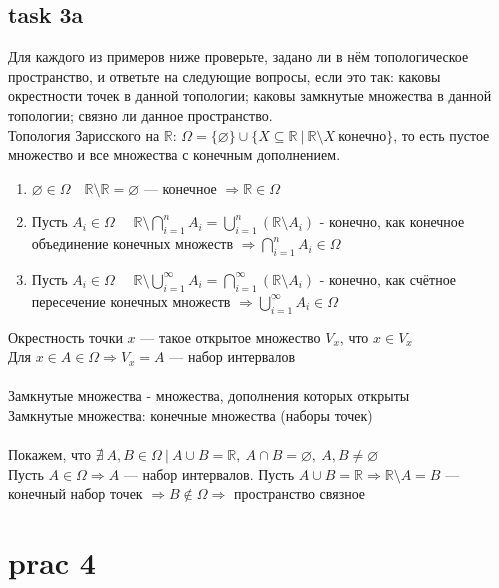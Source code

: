 \documentclass[12pt]{article}
\begin{document}
\subsection*{task 3a}

Для каждого из примеров ниже проверьте, задано ли в нём топологическое пространство, и ответьте на следующие вопросы, если это так:
каковы окрестности точек в данной топологии;
каковы замкнутые множества в данной топологии;
связно ли данное пространство.\\

Топология Зарисского на $\mathbb{R}$: 
$\Omega = \{\varnothing\} \cup \{ X \subseteq \mathbb{R}\ |\ \mathbb{R} \setminus X\ \text{конечно} \}$,
то есть пустое множество и все множества с конечным дополнением.

\begin{enumerate}
    \item $\varnothing \in \Omega\quad \mathbb{R}\setminus \mathbb{R} = \varnothing$ --- конечное $\Rightarrow \mathbb{R}\in \Omega$
    \item Пусть $A_i \in \Omega\quad$ $\mathbb{R} \setminus \bigcap_{i=1}^n A_i = \bigcup_{i=1}^n (\mathbb{R}\setminus A_i)$ - конечно, как конечное объединение конечных множеств $\Rightarrow \bigcap_{i=1}^n A_i \in \Omega$
    \item Пусть $A_i \in \Omega\quad$ $\mathbb{R} \setminus \bigcup_{i=1}^\infty A_i = \bigcap_{i=1}^\infty (\mathbb{R}\setminus A_i)$ - конечно, как счётное пересечение конечных множеств $\Rightarrow \bigcup_{i=1}^\infty A_i \in \Omega$
\end{enumerate}
Окрестность точки $x$ --- такое открытое множество $V_x$, что $x \in V_x$\\
Для $x \in A \in \Omega\Rightarrow V_x = A$ --- набор интервалов\\\\
Замкнутые множества - множества, дополнения которых открыты\\
Замкнутые множества: конечные множества (наборы точек)\\\\
Покажем, что $\nexists\ A, B \in \Omega\ |\ A\cup B = \mathbb{R},\ A\cap B = \varnothing,\ A, B \neq \varnothing$\\
Пусть $A \in \Omega \Rightarrow A$ --- набор интервалов. Пусть $ A\cup B = \mathbb{R} \Rightarrow \mathbb{R} \setminus A = B$ --- конечный набор точек $\Rightarrow B \notin \Omega \Rightarrow$ пространство связное

\section*{prac 4}
\end{document}
